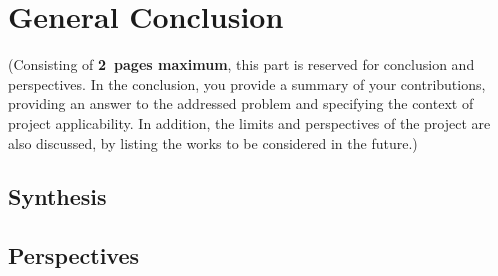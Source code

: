 \chapter*{General Conclusion} 
\label{chap:conclusion}

(Consisting of \textbf{2~pages maximum}, this part is reserved for conclusion and perspectives. In the conclusion, you provide a summary of your contributions, providing an answer to the addressed problem and specifying the context of project applicability. In addition, the limits and perspectives of the project are also discussed, by listing the works to be considered in the future.)

\section*{Synthesis}
\section*{Perspectives}
